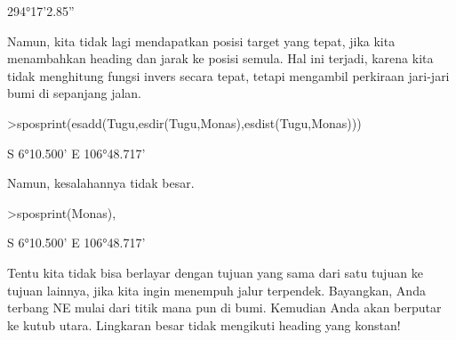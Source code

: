 \documentclass[a4paper,10pt]{article}
\begin{document}
\begin{eulernotebook}
\begin{eulercomment}
\begin{eulercomment}
\begin{euleroutput}
  294°17'2.85''
\end{euleroutput}
\begin{eulercomment}
Namun, kita tidak lagi mendapatkan posisi target yang tepat, jika kita
menambahkan heading dan jarak ke posisi semula. Hal ini terjadi,
karena kita tidak menghitung fungsi invers secara tepat, tetapi
mengambil perkiraan jari-jari bumi di sepanjang jalan.
\end{eulercomment}
\begin{eulerprompt}
>sposprint(esadd(Tugu,esdir(Tugu,Monas),esdist(Tugu,Monas)))
\end{eulerprompt}
\begin{euleroutput}
  S 6°10.500' E 106°48.717'
\end{euleroutput}
\begin{eulercomment}
Namun, kesalahannya tidak besar.
\end{eulercomment}
\begin{eulerprompt}
>sposprint(Monas),
\end{eulerprompt}
\begin{euleroutput}
  S 6°10.500' E 106°48.717'
\end{euleroutput}
\begin{eulercomment}
Tentu kita tidak bisa berlayar dengan tujuan yang sama dari satu
tujuan ke tujuan lainnya, jika kita ingin menempuh jalur terpendek.
Bayangkan, Anda terbang NE mulai dari titik mana pun di bumi. Kemudian
Anda akan berputar ke kutub utara. Lingkaran besar tidak mengikuti
heading yang konstan!


\end{eulercomment}
\end{eulercomment}
\end{eulercomment}
\end{eulernotebook}
\end{document}
